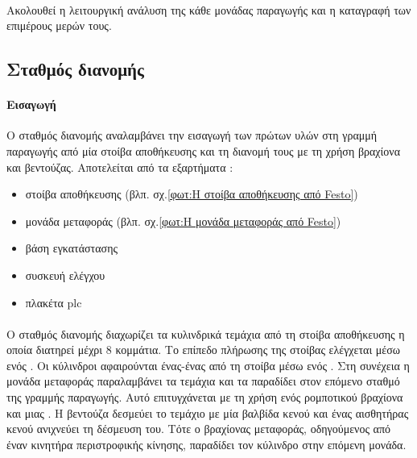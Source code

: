 \documentclass[a4paper,12pt,twoside]{report}
\begin{document}
{			\paragraph{} {Ακολουθεί η λειτουργική ανάλυση της κάθε μονάδας παραγωγής και η καταγραφή των επιμέρους μερών τους.
			}

			\FloatBarrier
			\subsection{Σταθμός διανομής \cite{FestoMPSDistributionStationManual} \cite{ΤοΦυσικόΣύστημαFestoMPS} \cite{UMLΕνσωματωμέναΣυστήματα}}
			
			\label{ενότ:Σταθμός διανομής}
				\paragraph{Εισαγωγή} {Ο σταθμός διανομής αναλαμβάνει την εισαγωγή των πρώτων υλών στη γραμμή παραγωγής από μία στοίβα αποθήκευσης και τη διανομή τους με τη χρήση βραχίονα και βεντούζας. Αποτελείται από τα εξαρτήματα :
				}
				\begin{itemize}
					\item στοίβα αποθήκευσης {\footnotesize (βλπ. σχ.\ref{φωτ:Η στοίβα αποθήκευσης από Festo})}
					\item μονάδα μεταφοράς {\footnotesize (βλπ. σχ.\ref{φωτ:Η μονάδα μεταφοράς από Festo})}
					\item βάση εγκατάστασης
					\item συσκευή ελέγχου
					\item πλακέτα plc
				\end{itemize}
				\paragraph{} {Ο σταθμός διανομής διαχωρίζει τα κυλινδρικά τεμάχια από τη στοίβα αποθήκευσης η οποία διατηρεί μέχρι 8 κομμάτια. Το επίπεδο πλήρωσης της στοίβας ελέγχεται μέσω ενός . Οι κύλινδροι αφαιρούνται ένας-ένας από τη στοίβα μέσω ενός . Στη συνέχεια η \gls{μονάδα μεταφοράς} παραλαμβάνει τα τεμάχια και τα παραδίδει στον επόμενο σταθμό της γραμμής παραγωγής. Αυτό επιτυγχάνεται με τη χρήση ενός ρομποτικού βραχίονα και μιας . Η βεντούζα δεσμεύει το τεμάχιο με μία βαλβίδα κενού και ένας \gls{αισθητήρας κενού} ανιχνεύει τη δέσμευση του. Τότε ο βραχίονας μεταφοράς, οδηγούμενος από έναν κινητήρα περιστροφικής κίνησης, παραδίδει τον κύλινδρο στην επόμενη μονάδα.
				}
				
}
\end{document}
